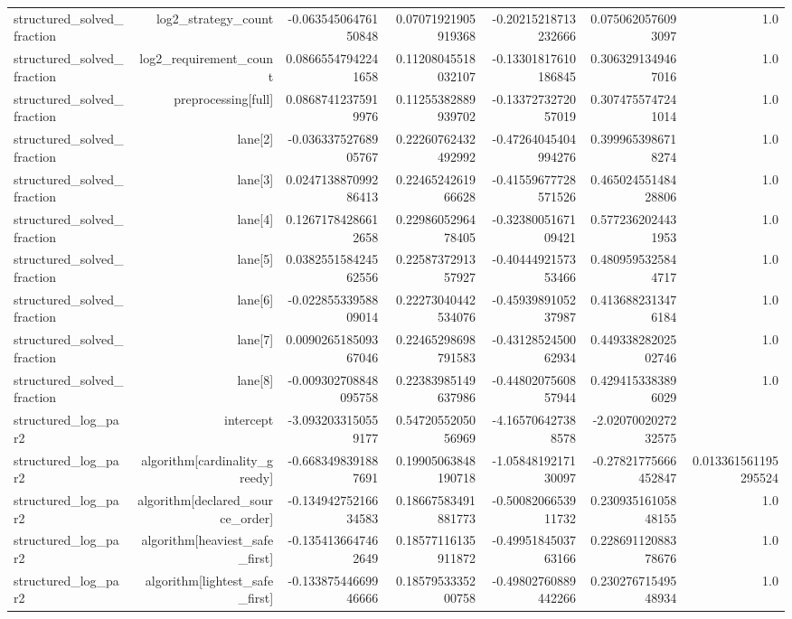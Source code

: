 {\begin{longtable}{lrrrrrr}
structured\_solved\_fraction & log2\_strategy\_count & -0.06354506476150848 & 0.07071921905919368 & -0.20215218713232666 & 0.0750620576093097 & 1.0 \\
structured\_solved\_fraction & log2\_requirement\_count & 0.08665547942241658 & 0.11208045518032107 & -0.13301817610186845 & 0.3063291349467016 & 1.0 \\
structured\_solved\_fraction & preprocessing[full] & 0.08687412375919976 & 0.11255382889939702 & -0.1337273272057019 & 0.3074755747241014 & 1.0 \\
structured\_solved\_fraction & lane[2] & -0.03633752768905767 & 0.22260762432492992 & -0.47264045404994276 & 0.3999653986718274 & 1.0 \\
structured\_solved\_fraction & lane[3] & 0.024713887099286413 & 0.2246524261966628 & -0.41559677728571526 & 0.46502455148428806 & 1.0 \\
structured\_solved\_fraction & lane[4] & 0.12671784286612658 & 0.2298605296478405 & -0.3238005167109421 & 0.5772362024431953 & 1.0 \\
structured\_solved\_fraction & lane[5] & 0.038255158424562556 & 0.2258737291357927 & -0.4044492157353466 & 0.4809595325844717 & 1.0 \\
structured\_solved\_fraction & lane[6] & -0.02285533958809014 & 0.22273040442534076 & -0.4593989105237987 & 0.4136882313476184 & 1.0 \\
structured\_solved\_fraction & lane[7] & 0.009026518509367046 & 0.22465298698791583 & -0.4312852450062934 & 0.44933828202502746 & 1.0 \\
structured\_solved\_fraction & lane[8] & -0.009302708848095758 & 0.22383985149637986 & -0.4480207560857944 & 0.4294153383896029 & 1.0 \\
structured\_log\_par2 & intercept & -3.0932033150559177 & 0.5472055205056969 & -4.165706427388578 & -2.0207002027232575 &  \\
structured\_log\_par2 & algorithm[cardinality\_greedy] & -0.6683498391887691 & 0.19905063848190718 & -1.0584819217130097 & -0.27821775666452847 & 0.013361561195295524 \\
structured\_log\_par2 & algorithm[declared\_source\_order] & -0.13494275216634583 & 0.18667583491881773 & -0.5008206653911732 & 0.23093516105848155 & 1.0 \\
structured\_log\_par2 & algorithm[heaviest\_safe\_first] & -0.1354136647462649 & 0.18577116135911872 & -0.4995184503763166 & 0.22869112088378676 & 1.0 \\
structured\_log\_par2 & algorithm[lightest\_safe\_first] & -0.13387544669946666 & 0.1857953335200758 & -0.49802760889442266 & 0.23027671549548934 & 1.0 \\

\end{longtable}}
